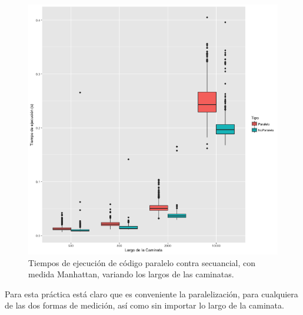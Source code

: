 \documentclass[a4paper]{article}
\begin{document}
\begin{figure}[h]
\centering
\includegraphics[width=0.7\linewidth]{LargoR2Ma}
\caption{Tiempos de ejecución de código paralelo contra secuancial, con medida Manhattan, variando los largos de las caminatas.}
\label{fig:LargoR2Ma}
\end{figure}

Para esta práctica está claro que es conveniente la paralelización, para cualquiera de las dos formas de medición, así como sin importar lo largo de la caminata.
\end{document}
